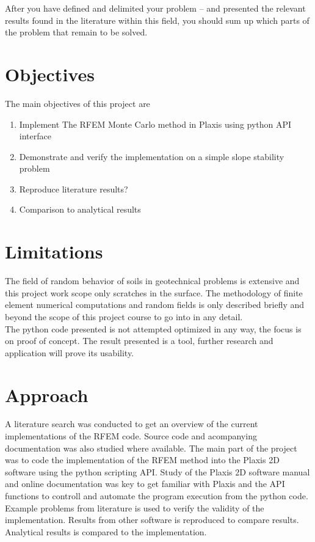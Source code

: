 After you have defined and delimited your problem -- and presented the relevant results found in the literature within this field, you should sum up which parts of the problem that remain to be solved.
\section{Objectives}
The main objectives of this project are
\begin{enumerate}
\item Implement The RFEM Monte Carlo method in Plaxis using python API interface
\item Demonstrate and verify the implementation on a simple slope stability problem
\item Reproduce literature results?
\item Comparison to analytical results
\end{enumerate}


\section{Limitations}
The field of random behavior of soils in geotechnical problems is extensive and this project work scope only scratches in the surface. The methodology of finite element numerical computations and random fields is only described briefly and beyond the scope of this project course to go into in any detail.\\

The python code presented is not attempted optimized in any way, the focus is on proof of concept. The result presented is a tool, further research and application will prove its usability.

\section{Approach}
A literature search was conducted to get an overview of the current implementations of the RFEM code. Source code and acompanying documentation was also studied where available. The main part of the project was to code the implementation of the RFEM method into the Plaxis 2D software using the python scripting API. Study of the Plaxis 2D software manual and online documentation was key to get familiar with Plaxis and the API functions to controll and automate the program execution from the python code. Example problems from literature is used to verify the validity of the implementation. Results from other software is reproduced to compare results.
Analytical results is compared to the implementation.



